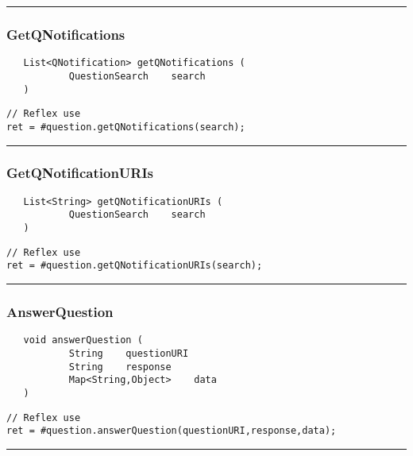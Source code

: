 \rule{15cm}{2pt}
\subsubsection{GetQNotifications}
\label{Api:GetQNotifications}
\begin{verbatim}
   List<QNotification> getQNotifications (
           QuestionSearch    search
   )
\end{verbatim}
\begin{lstlisting}[language=reflex]
// Reflex use
ret = #question.getQNotifications(search);
\end{lstlisting}



\rule{15cm}{2pt}
\subsubsection{GetQNotificationURIs}
\label{Api:GetQNotificationURIs}
\begin{verbatim}
   List<String> getQNotificationURIs (
           QuestionSearch    search
   )
\end{verbatim}
\begin{lstlisting}[language=reflex]
// Reflex use
ret = #question.getQNotificationURIs(search);
\end{lstlisting}



\rule{15cm}{2pt}
\subsubsection{AnswerQuestion}
\label{Api:AnswerQuestion}
\begin{verbatim}
   void answerQuestion (
           String    questionURI
           String    response
           Map<String,Object>    data
   )
\end{verbatim}
\begin{lstlisting}[language=reflex]
// Reflex use
ret = #question.answerQuestion(questionURI,response,data);
\end{lstlisting}



\rule{15cm}{2pt}
